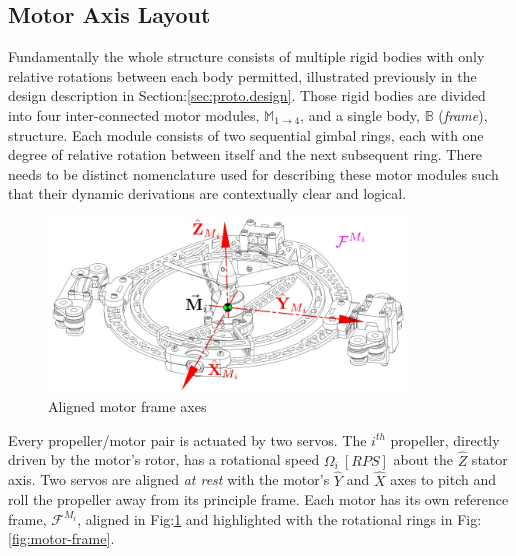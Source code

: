 \subsection{Motor Axis Layout}
\label{subsec:proto.conventions.motoraxis}
Fundamentally the whole structure consists of multiple rigid bodies with only relative rotations between each body permitted, illustrated previously in the design description in Section:\ref{sec:proto.design}. Those rigid bodies are divided into four inter-connected motor modules, $\mathbb{M}_{1\rightarrow 4}$, and a single body, $\mathbb{B}$ (\emph{frame}), structure. Each module consists of two sequential gimbal rings, each with one degree of relative rotation between itself and the next subsequent ring. There needs to be distinct nomenclature used for describing these motor modules such that their dynamic derivations are contextually clear and logical. 
\begin{figure}[htbp]
\centering
\includegraphics[width=0.85\textwidth]{figs/motor-axes}
\caption{Aligned motor frame axes}
\label{fig:motor-axes}
\end{figure}
\par
Every propeller/motor pair is actuated by two servos. The $i^{th}$ propeller, directly driven by the motor's rotor, has a rotational speed $\Omega_i~[RPS]$ about the $\hat{Z}$ stator axis. Two servos are aligned \emph{at rest} with the motor's $\hat{Y}$ and $\hat{X}$ axes to pitch and roll the propeller away from its principle frame. Each motor has its own reference frame, $\mathcal{F}^{M_i}$, aligned in Fig:\ref{fig:motor-axes} and highlighted with the rotational rings in Fig:\ref{fig:motor-frame}.
\par
